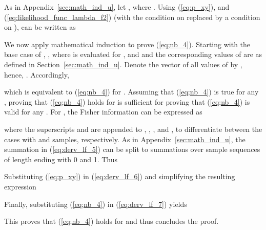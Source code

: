 \documentclass[11pt,draftclsnofoot,journal,onecolumn]{IEEEtran}
\begin{document}
\begin{IEEEproof} As in Appendix~\ref{sec:math_ind_u}, let , where . Using (\ref{eq:p_xy}), and (\ref{eq:likelihood_func_lambda_f2}) (with the condition on  replaced by a condition on ),  can be written as

We now apply mathematical induction to prove (\ref{eq;nb_4}). Starting with the base case of , , where  is  evaluated for , and  and the corresponding values of  are as defined in Section~\ref{sec:math_ind_u}. Denote the vector of all values of  by , hence, . Accordingly, 

which is equivalent to (\ref{eq;nb_4}) for . Assuming that (\ref{eq;nb_4}) is true for any , proving that (\ref{eq;nb_4}) holds for  is sufficient for proving that (\ref{eq;nb_4}) is valid for any . For , the Fisher information can be expressed as

where the superscripts  and  are appended to , , , and , to differentiate between the cases with  and  samples, respectively. As in Appendix~\ref{sec:math_ind_u}, the summation in (\ref{eq:derv_lf_5}) can be split to summations over sample sequences of length  ending with 0 and 1. Thus

Substituting (\ref{eq:p_xy}) in (\ref{eq:derv_lf_6}) and simplifying the resulting expression

Finally, substituting (\ref{eq;nb_4}) in (\ref{eq:derv_lf_7}) yields

This proves that (\ref{eq;nb_4}) holds for  and thus concludes the proof.
\end{IEEEproof}
\end{document}
